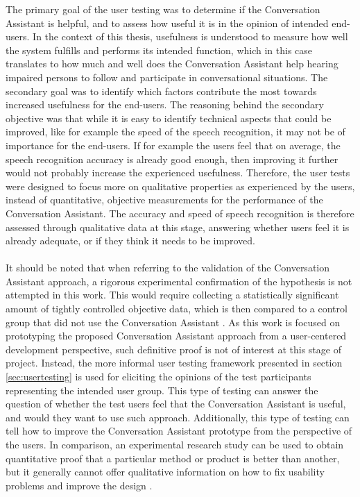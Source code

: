 \documentclass[english, 12pt, a4paper, pdftex, elec, utf8]{aaltothesis}
\begin{document}
The primary goal of the user testing was to determine if the Conversation Assistant is helpful, and to assess how useful it is in the opinion of intended end-users. In the context of this thesis, usefulness is understood to measure how well the system fulfills and performs its intended function, which in this case translates to how much and well does the Conversation Assistant help hearing impaired persons to follow and participate in conversational situations. The secondary goal was to identify which factors contribute the most towards increased usefulness for the end-users. The reasoning behind the secondary objective was that while it is easy to identify technical aspects that could be improved, like for example the speed of the speech recognition, it may not be of importance for the end-users. If for example the users feel that on average, the speech recognition accuracy is already good enough, then improving it further would not probably increase the experienced usefulness. Therefore, the user tests were designed to focus more on qualitative properties as experienced by the users, instead of quantitative, objective measurements for the performance of the Conversation Assistant. The accuracy and speed of speech recognition is therefore assessed through qualitative data at this stage, answering whether users feel it is already adequate, or if they think it needs to be improved. \\\\
It should be noted that when referring to the validation of the Conversation Assistant approach, a rigorous experimental confirmation of the hypothesis is not attempted in this work. This would require collecting a statistically significant amount of tightly controlled objective data, which is then compared to a control group that did not use the Conversation Assistant \cite[p.~23--24]{richter2014user}. As this work is focused on prototyping the proposed Conversation Assistant approach from a user-centered development perspective, such definitive proof is not of interest at this stage of project. Instead, the more informal user testing framework presented in section \ref{sec:usertesting} is used for eliciting the opinions of the test participants representing the intended user group. This type of testing can answer the question of whether the test users feel that the Conversation Assistant is useful, and would they want to use such approach. Additionally, this type of testing can tell how to improve the Conversation Assistant prototype from the perspective of the users. In comparison, an experimental research study can be used to obtain quantitative proof that a particular method or product is better than another, but it generally cannot offer qualitative information on how to fix usability problems and improve the design \cite[p.~24--25]{richter2014user}. \\\\
\end{document}
